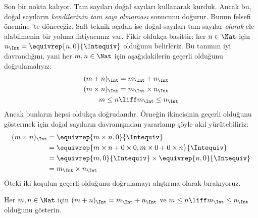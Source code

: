 \documentclass[../../../include/open-logic-section]{subfiles}
\begin{document}
Son bir nokta kalıyor. Tam sayıları doğal sayıları kullanarak kurduk. Ancak bu,
doğal sayıların \emph{kendilerinin tam sayı olmaması} sonucunu doğurur. Bunun
felsefi önemine 'te döneceğiz. Salt teknik açıdan ise doğal
sayıları tam sayılar \emph{olarak} ele alabilmenin bir yoluna ihtiyacımız var.
Fikir oldukça basittir: her $n \in \Nat$ için
$n_\Int = \equivrep{n, 0}{\Intequiv}$ olduğunu belirleriz. Bu tanımın iyi
davrandığını, yani her $m, n \in \Nat$ için aşağıdakilerin geçerli olduğunu
doğrulamalıyız:
\begin{align*}
	(m + n)_\Int &= m_\Int + n_\Int\\
	(m \times n)_\Int &= m_\Int \times n_\Int\\
	m \leq n &\liff m_\Int \leq n_\Int
\end{align*}
Ancak bunların hepsi oldukça doğrudandır. Örneğin ikincisinin geçerli olduğunu
göstermek için doğal sayıların davranışından yararlanıp şöyle akıl yürütebiliriz:
	\begin{align*}
		(m \times n)_\Int  &= \equivrep{m \times n, 0}{\Intequiv} \\
		&= \equivrep{m \times n + 0 \times 0, m \times 0 + 0 \times n}{\Intequiv} \\
		&= \equivrep{m, 0}{\Intequiv} \times \equivrep{n, 0}{\Intequiv} \\
		&= m_\Int \times n_\Int
	\end{align*}
Öteki iki koşulun geçerli olduğunu doğrulamayı alıştırma olarak bırakıyoruz.
\begin{prob}
	Her $m, n \in \Nat$ için $(m + n)_\Int = m_\Int + n_\Int$ ve
	$m \leq n \liff m_\Int \leq n_\Int$ olduğunu gösterin.
\end{prob}
\end{document}
